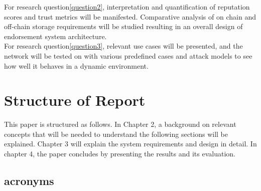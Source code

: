 For research question\ref{question2}, interpretation and quantification of reputation
scores and trust metrics will be manifested. Comparative analysis of on chain
and off-chain storage requirements will be studied resulting in an overall
design of endorsement system architecture. \\

For research question\ref{question3}, relevant use cases will be presented, and the
network will be tested on with various predefined cases and attack models to
see how well it behaves in a dynamic environment. \\

\section{Structure of Report}
This paper is structured as follows. In Chapter 2, a background on relevant
concepts that will be needed to understand the following sections will be
explained. Chapter 3 will explain the system requirements and design in detail.
In chapter 4, the paper concludes by presenting the results and its evaluation. 
\subsection{acronyms}



